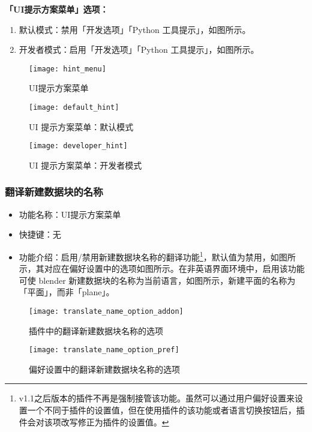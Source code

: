\documentclass{../../public_resources/doc}
\begin{document}
\noindent \textbf{「UI提示方案菜单」选项：}
\begin{enumerate}
    \item 默认模式：禁用「开发选项」「Python 工具提示」，如图所示。
    \item 开发者模式：启用「开发选项」「Python 工具提示」，如图所示。
\end{enumerate}

\begin{figure}[h!]
    \texttt{[image: hint\_menu]}
    \caption{UI提示方案菜单}
\end{figure}

\begin{figure}[h!]
    \begin{minipage}[t]{0.48\linewidth}
        \texttt{[image: default\_hint]}
        \caption{UI 提示方案菜单：默认模式}
        \label{UI 提示方案菜单：默认模式}
    \end{minipage}
    \quad
    \begin{minipage}[t]{0.48\linewidth}
        \texttt{[image: developer\_hint]}
        \caption{UI 提示方案菜单：开发者模式}
        \label{UI 提示方案菜单：开发者模式}
    \end{minipage}
\end{figure}

\subsubsection{翻译新建数据块的名称}
\begin{itemize}
    \item 功能名称：UI提示方案菜单
    \item 快捷键：无
    \item 功能介绍：启用/禁用新建数据块名称的翻译功能\footnote{v1.1之后版本的插件不再是强制接管该功能。虽然可以通过用户偏好设置来设置一个不同于插件的设置值，但在使用插件的该功能或者语言切换按钮后，插件会对该项改写修正为插件的设置值。}，默认值为禁用，如图所示，其对应在偏好设置中的选项如图所示。在非英语界面环境中，启用该功能可使 blender 新建数据块的名称为当前语言，如图所示，新建平面的名称为「平面」，而非「plane」。
\end{itemize}

\begin{figure}[h!]
    \begin{minipage}[t]{0.48\linewidth}
        \texttt{[image: translate\_name\_option\_addon]}
        \caption{插件中的翻译新建数据块名称的选项}
        \label{插件中的翻译新建数据块名称的选项}
    \end{minipage}
    \quad
    \begin{minipage}[t]{0.48\linewidth}
        \texttt{[image: translate\_name\_option\_pref]}
        \caption{偏好设置中的翻译新建数据块名称的选项}
        \label{偏好设置中的翻译新建数据块名称的选项}
    \end{minipage}
\end{figure}
\end{document}
